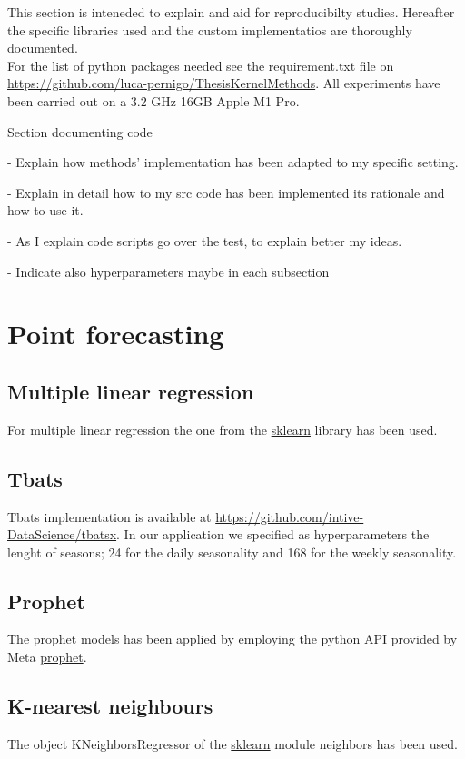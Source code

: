 This section is inteneded to explain and aid for reproducibilty studies. Hereafter the specific libraries used and the custom implementatios are thoroughly documented.
\\
For the list of python packages needed see the requirement.txt file on \url{https://github.com/luca-pernigo/ThesisKernelMethods}\label{github_repo}.
All experiments have been carried out on a 3.2 GHz 16GB Apple M1 Pro.


Section documenting code

- Explain how methods' implementation has been
adapted to my specific setting.

- Explain in detail how to my src code has been implemented
its rationale and how to use it.

- As I explain code scripts go over the test, to 
explain better my ideas.

- Indicate also hyperparameters maybe in each subsection

\section{Point forecasting}
\subsection{Multiple linear regression}
For multiple linear regression the one from the \href{https://scikit-learn.org/stable/}{sklearn} library has been used.

\subsection{Tbats}
Tbats implementation is available at \url{https://github.com/intive-DataScience/tbatsx}.
In our application we specified as hyperparameters the lenght of seasons; 24 for the daily seasonality and 168 for the weekly seasonality.

\subsection{Prophet}
The prophet models has been applied by employing the python API provided by Meta \href{https://facebook.github.io/prophet/docs/quick_start.html}{prophet}.

\subsection{K-nearest neighbours}
The object KNeighborsRegressor of the \href{https://scikit-learn.org/stable/}{sklearn} module neighbors has been used.

